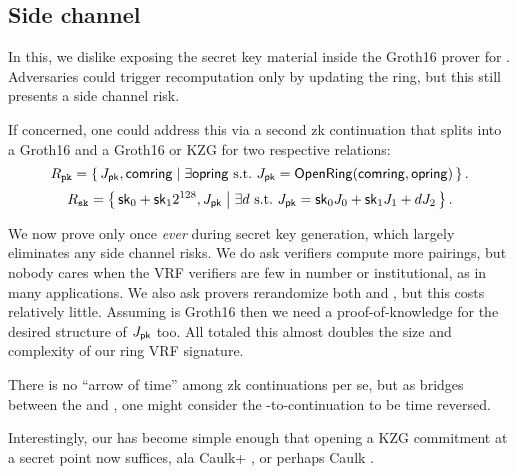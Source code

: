 

\subsection{Side channel}
\label{subsec:rvrf_side_channel}

In this, we dislike exposing the secret key material inside
 the Groth16 prover for \pifast.
Adversaries could trigger \pifast recomputation only by updating the ring,
but this still presents a side channel risk.

If concerned, one could address this via a second zk continuation that
splits \pifast into a Groth16 \pisk and a Groth16 or KZG \pipk for two
respective relations:
%
$$ \Rpk = \Setst{ J_\pk, \comring }{
 \exists \openring \textrm{\ s.t.\ }
  J_\pk = \eprint{\rVRF.}{}\OpenRing(\comring,\openring)
} \mathcomma \eprint{\quad\textrm{and}}{} $$ 
%
$$ \Rsk = \Setst{ \sk_0 + \sk_1 2^{128}, J_\pk }{ 
 \exists d \textrm{\ s.t.\ }
 J_\pk = \sk_0 \genJ_0 + \sk_1 \genJ_1 + d \genJ_2
} \mathperiod $$

We now prove \pisk only once {\it ever} during secret key generation,
which largely eliminates any side channel risks.
We do ask verifiers compute more pairings, but nobody cares when
the VRF verifiers are few in number or institutional,
 as in many applications.
We also ask provers rerandomize both \pisk and \pipk, but this costs relatively little.
Assuming \pipk is Groth16 then we need a proof-of-knowledge for the desired structure of $J_\mathsf{pk}$ too.
All totaled this almost doubles the size and complexity of our ring VRF signature.

There is no ``arrow of time'' among zk continuations per se, but
as \pisk bridges between the \PedVRF and \pipk,
one might consider the \pisk-to-\pipk continuation to be time reversed.

Interestingly, our \pipk has become simple enough that opening
a KZG commitment \cite{KZG} at a secret point now suffices,
 ala Caulk+ \cite{caulk+}, or perhaps Caulk \cite{caulk}.

\smallskip

